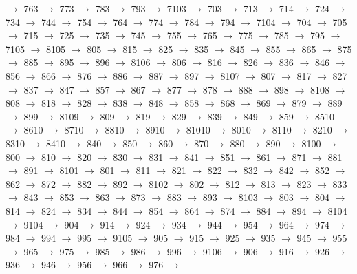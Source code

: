 $\rightarrow$ 763 $\rightarrow$ 773 $\rightarrow$ 783 $\rightarrow$ 793 $\rightarrow$ 7103 $\rightarrow$ 703 $\rightarrow$ 713 $\rightarrow$ 714 $\rightarrow$ 724 $\rightarrow$ 734 $\rightarrow$ 744 $\rightarrow$ 754 $\rightarrow$ 764 $\rightarrow$ 774 $\rightarrow$ 784 $\rightarrow$ 794 $\rightarrow$ 7104 $\rightarrow$ 704 $\rightarrow$ 705 $\rightarrow$ 715 $\rightarrow$ 725 $\rightarrow$ 735 $\rightarrow$ 745 $\rightarrow$ 755 $\rightarrow$ 765 $\rightarrow$ 775 $\rightarrow$ 785 $\rightarrow$ 795 $\rightarrow$ 7105 $\rightarrow$ 8105 $\rightarrow$ 805 $\rightarrow$ 815 $\rightarrow$ 825 $\rightarrow$ 835 $\rightarrow$ 845 $\rightarrow$ 855 $\rightarrow$ 865 $\rightarrow$ 875 $\rightarrow$ 885 $\rightarrow$ 895 $\rightarrow$ 896 $\rightarrow$ 8106 $\rightarrow$ 806 $\rightarrow$ 816 $\rightarrow$ 826 $\rightarrow$ 836 $\rightarrow$ 846 $\rightarrow$ 856 $\rightarrow$ 866 $\rightarrow$ 876 $\rightarrow$ 886 $\rightarrow$ 887 $\rightarrow$ 897 $\rightarrow$ 8107 $\rightarrow$ 807 $\rightarrow$ 817 $\rightarrow$ 827 $\rightarrow$ 837 $\rightarrow$ 847 $\rightarrow$ 857 $\rightarrow$ 867 $\rightarrow$ 877 $\rightarrow$ 878 $\rightarrow$ 888 $\rightarrow$ 898 $\rightarrow$ 8108 $\rightarrow$ 808 $\rightarrow$ 818 $\rightarrow$ 828 $\rightarrow$ 838 $\rightarrow$ 848 $\rightarrow$ 858 $\rightarrow$ 868 $\rightarrow$ 869 $\rightarrow$ 879 $\rightarrow$ 889 $\rightarrow$ 899 $\rightarrow$ 8109 $\rightarrow$ 809 $\rightarrow$ 819 $\rightarrow$ 829 $\rightarrow$ 839 $\rightarrow$ 849 $\rightarrow$ 859 $\rightarrow$ 8510 $\rightarrow$ 8610 $\rightarrow$ 8710 $\rightarrow$ 8810 $\rightarrow$ 8910 $\rightarrow$ 81010 $\rightarrow$ 8010 $\rightarrow$ 8110 $\rightarrow$ 8210 $\rightarrow$ 8310 $\rightarrow$ 8410 $\rightarrow$ 840 $\rightarrow$ 850 $\rightarrow$ 860 $\rightarrow$ 870 $\rightarrow$ 880 $\rightarrow$ 890 $\rightarrow$ 8100 $\rightarrow$ 800 $\rightarrow$ 810 $\rightarrow$ 820 $\rightarrow$ 830 $\rightarrow$ 831 $\rightarrow$ 841 $\rightarrow$ 851 $\rightarrow$ 861 $\rightarrow$ 871 $\rightarrow$ 881 $\rightarrow$ 891 $\rightarrow$ 8101 $\rightarrow$ 801 $\rightarrow$ 811 $\rightarrow$ 821 $\rightarrow$ 822 $\rightarrow$ 832 $\rightarrow$ 842 $\rightarrow$ 852 $\rightarrow$ 862 $\rightarrow$ 872 $\rightarrow$ 882 $\rightarrow$ 892 $\rightarrow$ 8102 $\rightarrow$ 802 $\rightarrow$ 812 $\rightarrow$ 813 $\rightarrow$ 823 $\rightarrow$ 833 $\rightarrow$ 843 $\rightarrow$ 853 $\rightarrow$ 863 $\rightarrow$ 873 $\rightarrow$ 883 $\rightarrow$ 893 $\rightarrow$ 8103 $\rightarrow$ 803 $\rightarrow$ 804 $\rightarrow$ 814 $\rightarrow$ 824 $\rightarrow$ 834 $\rightarrow$ 844 $\rightarrow$ 854 $\rightarrow$ 864 $\rightarrow$ 874 $\rightarrow$ 884 $\rightarrow$ 894 $\rightarrow$ 8104 $\rightarrow$ 9104 $\rightarrow$ 904 $\rightarrow$ 914 $\rightarrow$ 924 $\rightarrow$ 934 $\rightarrow$ 944 $\rightarrow$ 954 $\rightarrow$ 964 $\rightarrow$ 974 $\rightarrow$ 984 $\rightarrow$ 994 $\rightarrow$ 995 $\rightarrow$ 9105 $\rightarrow$ 905 $\rightarrow$ 915 $\rightarrow$ 925 $\rightarrow$ 935 $\rightarrow$ 945 $\rightarrow$ 955 $\rightarrow$ 965 $\rightarrow$ 975 $\rightarrow$ 985 $\rightarrow$ 986 $\rightarrow$ 996 $\rightarrow$ 9106 $\rightarrow$ 906 $\rightarrow$ 916 $\rightarrow$ 926 $\rightarrow$ 936 $\rightarrow$ 946 $\rightarrow$ 956 $\rightarrow$ 966 $\rightarrow$ 976 $\rightarrow$ 